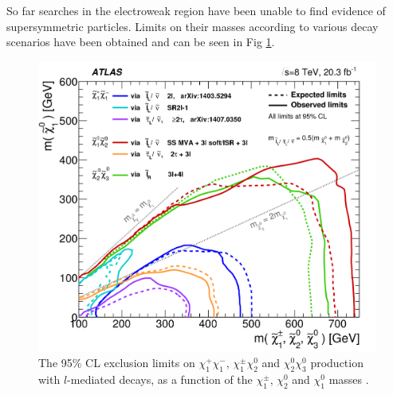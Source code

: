 So far searches in the electroweak region have been unable to find evidence of supersymmetric particles. Limits on their masses according to various decay scenarios have been obtained and can be seen in Fig \ref{fig:summaryplot}.
\begin{figure}[!ht]
	\centering
	\captionsetup{width=0.8\textwidth}
	\includegraphics[scale=0.15]{Chap3/fig_19b}
	\caption{The 95\% CL exclusion limits on $\chi_1^+\chi_1^-$, $\chi_1^{\pm}\chi_2^0$ and $\chi_2^0\chi_3^0$ production with $l$-mediated decays, as a function of the $\chi_1^{\pm},\,\chi_2^0$ and $\chi_1^0$ masses \citep{aad2016search}. }\label{fig:summaryplot}
\end{figure}

